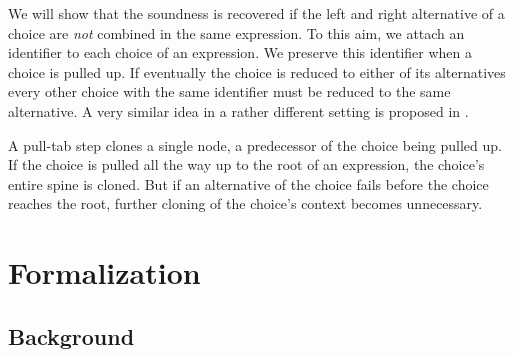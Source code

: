 \documentclass{mytlp}
\begin{document}
\noindent
We will show that the soundness is recovered
if the left and right
alternative of a choice are \emph{not} combined in the same expression.
To this aim, we attach an identifier to each
choice of an expression.
We preserve this identifier when a choice is pulled up.
If eventually the choice is reduced to either of its alternatives
every other choice with the same identifier
must be reduced to the same alternative.
A very similar idea in a rather different setting
is proposed in \cite{BrasselHuchAPLAS07,Brassel2011PhD}.

A pull-tab step clones a single node, 
a predecessor of the choice being pulled up.
If the choice is pulled all the way up to the root of an expression,
the choice's entire spine is cloned.
But if an alternative of the choice fails before the choice
reaches the root,
further cloning of the choice's context becomes unnecessary. 


\section{Formalization}

\subsection{Background}
\end{document}
